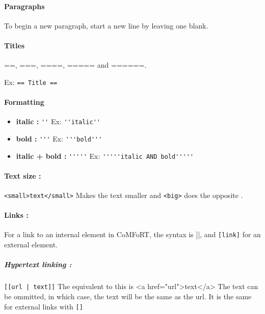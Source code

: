 \documentclass{article}
\begin{document}
     \paragraph{Paragraphs }
     To begin a new paragraph, start a new line by leaving one blank. 
 		
     \paragraph{Titles}  ==, ===, ====, ===== and ======.
	
		 Ex: \verb|== Title ==|
     \paragraph{Formatting} 
     	\begin{itemize}
	 \item \textbf{italic : } \verb|''|
	       Ex: \verb|''italic''|
	 \item \textbf{bold : } \verb|'''|
	       Ex: \verb|'''bold'''|
	 \item \textbf{italic + bold :} \verb|'''''|
	       Ex: \verb|'''''italic AND bold'''''|
	\end{itemize}
     \paragraph{Text size :}
		\verb|<small>text</small>| Makes the text smaller and  \verb|<big>| does the opposite . 
     \paragraph{Links :} 
      For a link to an internal element in CoMFoRT, the syntax is \verbl[[link]]|, and \verb|[link]| for an external element. 
		
		 \subparagraph{Hypertext linking :}
		 \verb?[[url | text]]?
		 The equivalent to this is \verbl<a href="url">text</a>
	The text can be ommitted, in which case, the text will be the same as the url. It is the same for external links with \verb|[]|
		   	   
\end{document}
